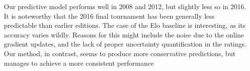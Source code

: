 Our predictive model performs well in 2008 and 2012, but slightly less so in 2016.
It is noteworthy that the 2016 final tournament has been generally less predictable than earlier editions.
The case of the Elo baseline is interesting, as its accuracy varies wildly.
Reasons for this might include the noise due to the online gradient updates, and the lack of proper uncertainty quantification in the ratings.
Our method, in contrast, seems to produce more conservative predictions, but manages to achieve a more consistent performance

